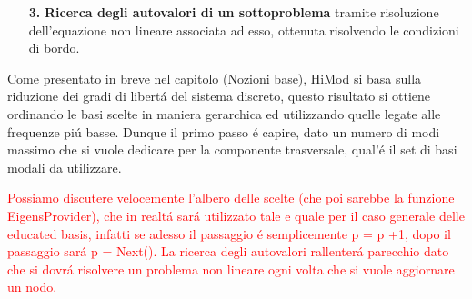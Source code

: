 \begin{itemize}
{}{Esempio - RRRR}

\item[\textbf{3.}] \textbf{Ricerca degli autovalori di un sottoproblema} tramite risoluzione dell'equazione non lineare associata ad esso, ottenuta risolvendo le condizioni di bordo.
\end{itemize}

Come presentato in breve nel capitolo (Nozioni base), HiMod si basa sulla riduzione dei gradi di libert\'a del sistema discreto, questo risultato si ottiene ordinando le basi scelte in maniera gerarchica ed utilizzando quelle legate alle frequenze pi\'u basse. Dunque il primo passo \'e capire, dato un numero di modi massimo che si vuole dedicare per la componente trasversale, qual'\'e il set di basi modali da utilizzare.


\textcolor{red}{Possiamo discutere velocemente l'albero delle scelte (che poi sarebbe la funzione EigensProvider), che in realt\'a sar\'a utilizzato tale e quale per il caso generale delle educated basis, infatti se adesso il passaggio \'e semplicemente p = p +1, dopo il passaggio sar\'a p = Next().
La ricerca degli autovalori rallenter\'a parecchio dato che si dovr\'a risolvere un problema non lineare ogni volta che si vuole aggiornare un nodo.}

